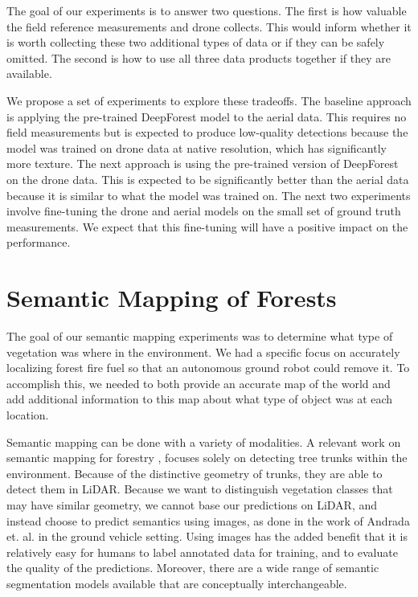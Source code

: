 The goal of our experiments is to answer two questions. The first is how valuable the field reference measurements and drone collects. This would inform whether it is worth collecting these two additional types of data or if they can be safely omitted. The second is how to use all three data products together if they are available.

We propose a set of experiments to explore these tradeoffs. The baseline approach is applying the pre-trained DeepForest model to the aerial data. This requires no field measurements but is expected to produce low-quality detections because the model was trained on drone data at native resolution, which has significantly more texture. The next approach is using the pre-trained version of DeepForest on the drone data. This is expected to be significantly better than the aerial data because it is similar to what the model was trained on. The next two experiments involve fine-tuning the drone and aerial models on the small set of ground truth measurements. We expect that this fine-tuning will have a positive impact on the performance.

\section{Semantic Mapping of Forests}
The goal of our semantic mapping experiments was to determine what type of vegetation was where in the environment. We had a specific focus on accurately localizing forest fire fuel so that an autonomous ground robot could remove it. To accomplish this, we needed to both provide an accurate map of the world and add additional information to this map about what type of object was at each location.

Semantic mapping can be done with a variety of modalities. A relevant work on semantic mapping for forestry \cite{Chen2020SLOAM:Inventory}, focuses solely on detecting tree trunks within the environment. Because of the distinctive geometry of trunks, they are able to detect them in LiDAR. Because we want to distinguish vegetation classes that may have similar geometry, we cannot base our predictions on LiDAR, and instead choose to predict semantics using images, as done in the work of Andrada et. al. \cite{Andrada2020} in the ground vehicle setting. Using images has the added benefit that it is relatively easy for humans to label annotated data for training, and to evaluate the quality of the predictions. Moreover, there are a wide range of semantic segmentation models available that are conceptually interchangeable. 

